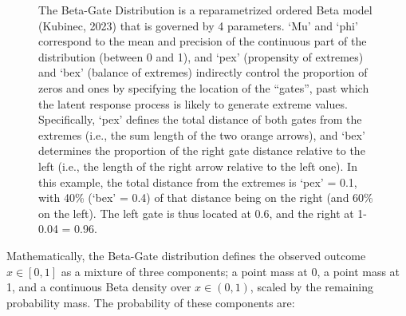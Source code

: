 \documentclass[
  jou,
  floatsintext,
  longtable,
  nolmodern,
  notxfonts,
  notimes,
  colorlinks=true,linkcolor=blue,citecolor=blue,urlcolor=blue]{apa7}
\begin{document}
\begin{figure}

\caption{\label{fig-one}The Beta-Gate Distribution is a reparametrized
ordered Beta model (Kubinec, 2023) that is governed by 4 parameters.
`Mu' and `phi' correspond to the mean and precision of the continuous
part of the distribution (between 0 and 1), and `pex' (propensity of
extremes) and `bex' (balance of extremes) indirectly control the
proportion of zeros and ones by specifying the location of the
``gates'', past which the latent response process is likely to generate
extreme values. Specifically, `pex' defines the total distance of both
gates from the extremes (i.e., the sum length of the two orange arrows),
and `bex' determines the proportion of the right gate distance relative
to the left (i.e., the length of the right arrow relative to the left
one). In this example, the total distance from the extremes is `pex' =
0.1, with 40\% (`bex' = 0.4) of that distance being on the right (and
60\% on the left). The left gate is thus located at 0.6, and the right
at 1-0.04 = 0.96.}


\end{figure}%

Mathematically, the Beta-Gate distribution defines the observed outcome
\(x \in [0, 1]\) as a mixture of three components; a point mass at 0, a
point mass at 1, and a continuous Beta density over \(x \in (0,1)\),
scaled by the remaining probability mass. The probability of these
components are:
\end{document}
